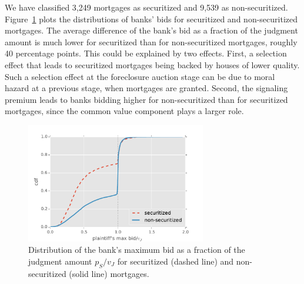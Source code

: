 \documentclass[11pt,twopage]{article}
\begin{document}
We have classified 3,249 mortgages as securitized and 9,539 as
non-securitized. Figure~\ref{fig:distr-maxbid-sec-nonsec} plots the
distributions of banks' bids for securitized and non-securitized
mortgages. The average difference of the bank's bid as a fraction of
the judgment amount is much lower for securitized than for
non-securitized mortgages, roughly 40 percentage points. This could be
explained by two effects. First, a selection effect that leads to
securitized mortgages being backed by houses of lower quality. Such a
selection effect at the foreclosure auction stage can be due to moral
hazard at a previous stage, when mortgages are granted. Second, the
signaling premium leads to banks bidding higher for non-securitized
than for securitized mortgages, since the common value component plays
a larger role.

\begin{figure}
  \begin{center}
    \includegraphics[width=0.7\textwidth]{graphics/distr-maxbid-sec-nonsec}
    \caption{Distribution of the bank's maximum bid as a fraction of
      the judgment amount $p_S/v_J$ for securitized (dashed line) and
      non-securitized (solid line)
      mortgages.\label{fig:distr-maxbid-sec-nonsec}}
  \end{center}
\end{figure}
\end{document}

